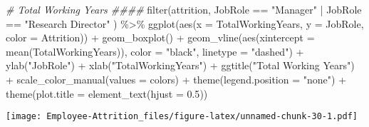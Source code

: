 \documentclass[
]{article}
\newenvironment{Shaded}{\begin{snugshade}}{\end{snugshade}}
\newcommand{\AttributeTok}[1]{\textcolor[rgb]{0.77,0.63,0.00}{#1}}
\newcommand{\CommentTok}[1]{\textcolor[rgb]{0.56,0.35,0.01}{\textit{#1}}}
\newcommand{\FloatTok}[1]{\textcolor[rgb]{0.00,0.00,0.81}{#1}}
\newcommand{\FunctionTok}[1]{\textcolor[rgb]{0.00,0.00,0.00}{#1}}
\newcommand{\NormalTok}[1]{#1}
\newcommand{\SpecialCharTok}[1]{\textcolor[rgb]{0.00,0.00,0.00}{#1}}
\newcommand{\StringTok}[1]{\textcolor[rgb]{0.31,0.60,0.02}{#1}}
\begin{document}
\begin{Shaded}
\begin{Highlighting}[]
\CommentTok{\# Total Working Years \#\#\#\#}
\FunctionTok{filter}\NormalTok{(attrition, JobRole }\SpecialCharTok{==} \StringTok{"Manager"} \SpecialCharTok{|}\NormalTok{ JobRole }\SpecialCharTok{==} \StringTok{"Research Director"}\NormalTok{ ) }\SpecialCharTok{\%\textgreater{}\%}
  \FunctionTok{ggplot}\NormalTok{(}\FunctionTok{aes}\NormalTok{(}\AttributeTok{x =}\NormalTok{ TotalWorkingYears, }\AttributeTok{y =}\NormalTok{ JobRole, }\AttributeTok{color =}\NormalTok{ Attrition)) }\SpecialCharTok{+}
  \FunctionTok{geom\_boxplot}\NormalTok{() }\SpecialCharTok{+}
  \FunctionTok{geom\_vline}\NormalTok{(}\FunctionTok{aes}\NormalTok{(}\AttributeTok{xintercept =} \FunctionTok{mean}\NormalTok{(TotalWorkingYears)), }\AttributeTok{color =} \StringTok{"black"}\NormalTok{, }\AttributeTok{linetype =} \StringTok{"dashed"}\NormalTok{) }\SpecialCharTok{+}
  \FunctionTok{ylab}\NormalTok{(}\StringTok{"JobRole"}\NormalTok{) }\SpecialCharTok{+}
  \FunctionTok{xlab}\NormalTok{(}\StringTok{"TotalWorkingYears"}\NormalTok{) }\SpecialCharTok{+}
  \FunctionTok{ggtitle}\NormalTok{(}\StringTok{"Total Working Years"}\NormalTok{) }\SpecialCharTok{+}
  \FunctionTok{scale\_color\_manual}\NormalTok{(}\AttributeTok{values =}\NormalTok{ colors) }\SpecialCharTok{+}
  \FunctionTok{theme}\NormalTok{(}\AttributeTok{legend.position =} \StringTok{"none"}\NormalTok{) }\SpecialCharTok{+}
  \FunctionTok{theme}\NormalTok{(}\AttributeTok{plot.title =} \FunctionTok{element\_text}\NormalTok{(}\AttributeTok{hjust =} \FloatTok{0.5}\NormalTok{)) }
\end{Highlighting}
\end{Shaded}

\texttt{[image: Employee-Attrition\_files/figure-latex/unnamed-chunk-30-1.pdf]}
\end{document}
